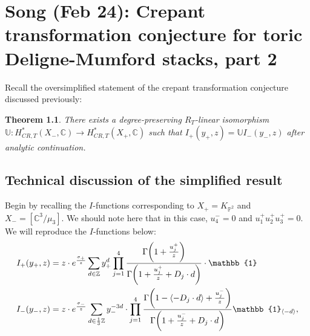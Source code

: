\documentclass[leqno, openany]{memoir}
\theoremstyle{definition}
\theoremstyle{remark}
\theoremstyle{plain}
\newtheorem*{thm*}{Theorem}
\theoremstyle{definition}
\theoremstyle{remark}
\newcommand{\C}{\mathbb{C}}
\newcommand{\Z}{\mathbb{Z}}
\renewcommand{\P}{\mathbb{P}}
\begin{document}
\chapter{Song (Feb 24): Crepant transformation conjecture for toric Deligne-Mumford stacks, part 2}%

Recall the oversimplified statement of the crepant transformation conjecture discussed previously:
\begin{thm*}
    There exists a degree-preserving $R_T$-linear isomorphism $\mathbb{U} \colon H^*_{CR, T}(X_-, \C) \to H^*_{CR, T}(X_+, \C)$ such that $I_+(y_+, z) = \mathbb{U} I_-(y_-, z)$ after analytic continuation.
\end{thm*}

\section{Technical discussion of the simplified result}

Begin by recalling the $I$-functions corresponding to $X_+ = K_{\P^2}$ and $X_- = [\C^3 / \mu_3]$. We should note here that in this case, $u_4^- = 0$ and $u_1^+ u_2^+ u_3^+ = 0$. We will reproduce the $I$-functions below:
\begin{align*}
    I_+(y_+, z) &= z \cdot e^{\frac{\sigma_+}{z}} \sum_{d \in \Z} y_+^d \prod_{j=1}^4 \frac{\Gamma\qty(1+\frac{u_j^+}{z})}{\Gamma\qty(1 + \frac{u_j^+}{z} + D_j \cdot d)} \cdot \mathbb{1} \\
    I_-(y_-, z) &= z \cdot e^{\frac{\sigma_-}{z}} \sum_{d \in \frac{1}{3}\Z} y_-^{-3d} \cdot \prod_{j=1}^4 \frac{\Gamma\qty(1-\ev{-D_j \cdot d} + \frac{u_j^-}{z})}{\Gamma\qty(1 + \frac{u_j^-}{z}+D_j \cdot d)}  \mathbb{1}_{\ev{-d}},
\end{align*}
\end{document}
